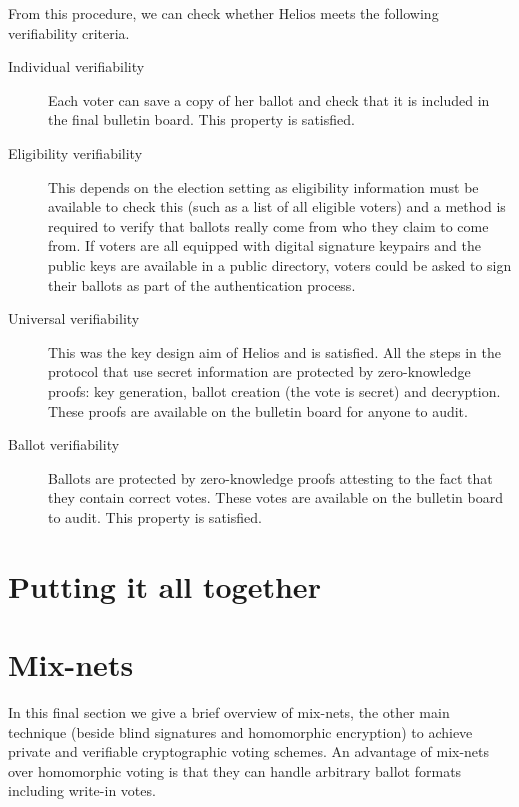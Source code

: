 \documentclass[envcountsame]{llncs}
\begin{document}
From this procedure, we can check whether Helios meets the following
verifiability criteria.

\begin{description}
\item[Individual verifiability]
Each voter can save a copy of her ballot and check that it is included in the
final bulletin board. This property is satisfied.

\item[Eligibility verifiability]
This depends on the election setting as eligibility information must be
available to check this (such as a list of all eligible voters) and a method is
required to verify that ballots really come from who they claim to come from. If
voters are all equipped with digital signature keypairs and the public keys are
available in a public directory, voters could be asked to sign their ballots as
part of the authentication process.

\item[Universal verifiability]
This was the key design aim of Helios and is satisfied. All the steps in the
protocol that use secret information are protected by zero-knowledge proofs:
key generation, ballot creation (the vote is secret) and decryption. These
proofs are available on the bulletin board for anyone to audit.

\item[Ballot verifiability]
Ballots are protected by zero-knowledge proofs attesting to the fact that they
contain correct votes. These votes are available on the bulletin board to audit.
This property is satisfied\footnotemark.
\end{description}


\section{Putting it all together}

\section{Mix-nets}

In this final section we give a brief overview of mix-nets, the other main
technique (beside blind signatures and homomorphic encryption) to achieve
private and verifiable cryptographic voting schemes. An advantage of mix-nets
over homomorphic voting is that they can handle arbitrary ballot formats
including write-in votes.
\end{document}
